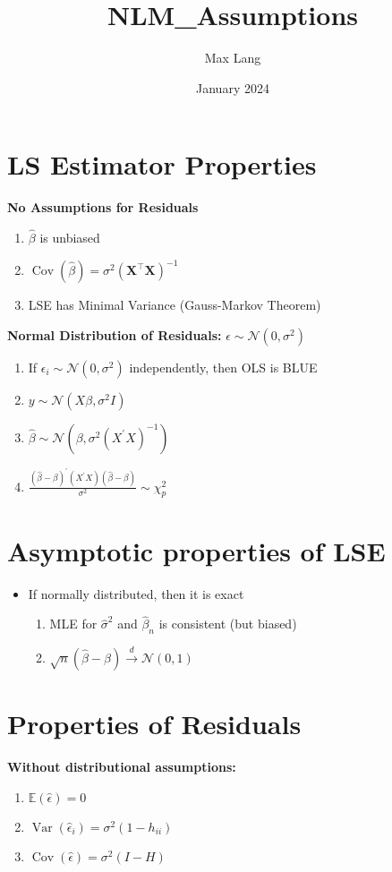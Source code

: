 \documentclass{article}
\title{NLM_Assumptions}
\author{Max Lang}
\date{January 2024}
\begin{document}
\section*{LS Estimator Properties}

\textbf{No Assumptions for Residuals}
\begin{enumerate}
    \item $\hat{\beta}$ is unbiased
    \item $\operatorname{Cov}(\hat{\beta}) = \sigma^2(\mathbf{X}^{\top} \mathbf{X})^{-1}$
    \item LSE has Minimal Variance (Gauss-Markov Theorem)
\end{enumerate}

\textbf{Normal Distribution of Residuals:} $\epsilon \sim \mathcal{N}(0, \sigma^2)$
\begin{enumerate}
    \item If $\epsilon_i \sim \mathcal{N}(0, \sigma^2)$ independently, then OLS is BLUE
    \item $y \sim \mathcal{N}(X\beta, \sigma^2 I)$
    \item $\widehat{\beta} \sim \mathcal{N}(\beta, \sigma^2(X^{\prime} X)^{-1})$
    \item $\frac{(\hat{\beta}-\beta)^{\prime}(X^{\prime} X)(\hat{\beta}-\beta)}{\sigma^2} \sim \chi_p^2$
\end{enumerate}

\section*{Asymptotic properties of LSE}
\begin{itemize}
    \item If normally distributed, then it is exact
    \begin{enumerate}
        \item MLE for $\hat{\sigma}^2$ and $\hat{\beta}_n$ is consistent (but biased)
        \item $\sqrt{n}(\hat{\beta}-\beta) \stackrel{d}{\rightarrow} \mathcal{N}(0,1)$
    \end{enumerate}
\end{itemize}

\section*{Properties of Residuals}
\textbf{Without distributional assumptions:}
\begin{enumerate}
    \item $\mathbb{E}(\hat{\epsilon})=0$
    \item $\operatorname{Var}(\hat{\epsilon}_i) = \sigma^2(1-h_{ii})$
    \item $\operatorname{Cov}(\hat{\epsilon}) = \sigma^2(I-H)$
\end{enumerate}
\end{document}
